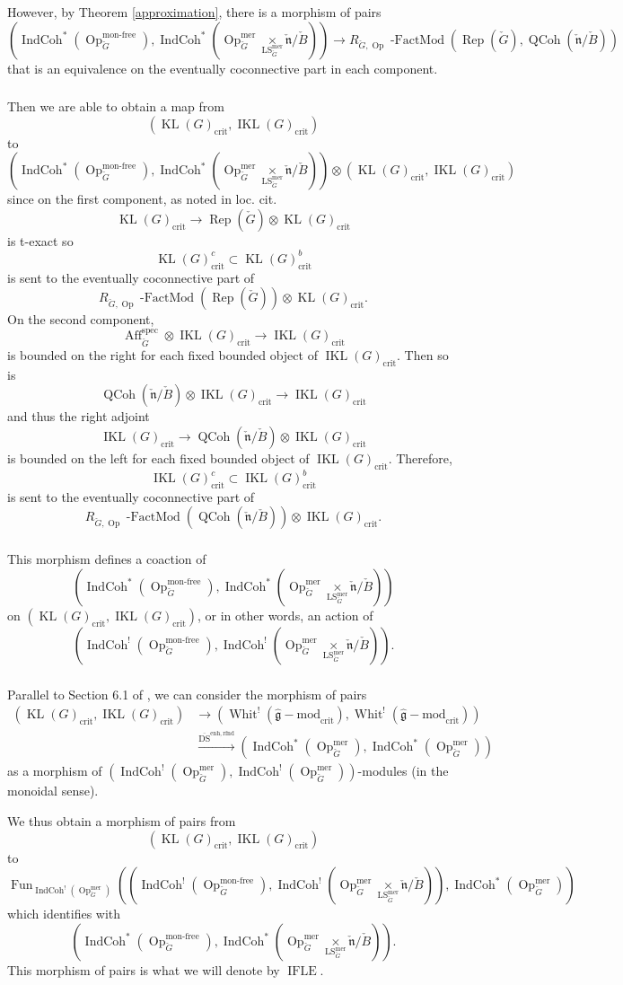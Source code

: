 \documentclass[10pt,a4paper]{amsart}
\newcommand{\on}[1]{\operatorname{#1}}
\newcommand{\QCoh}{\on{QCoh}}
\newcommand{\IndCoh}{\on{IndCoh}}
\newcommand{\gmod}{\on{\hat{\mathfrak{g}}-mod}}
\newcommand{\KL}{\on{KL}(G)_{\on{crit}}}
\newcommand{\IKL}{\on{IKL}(G)_{\on{crit}}}
\newcommand{\Gcheck}{\check{G}}
\newcommand{\ncheck}{\check{\mathfrak{n}}}
\newcommand{\Bcheck}{\check{B}}
\newcommand{\sssec}[1]{\subsubsection{}}
\begin{document}
However, by Theorem \ref{approximation}, there is a morphism of pairs
$$
(\IndCoh^*(\on{Op}_{\Gcheck}^{\on{mon-free}}), \IndCoh^*(\on{Op}_{\Gcheck}^{\on{mer}} \underset{\on{LS}_{\Gcheck}^{\on{mer}}}{\times} \ncheck/\Bcheck)) \to R_{\Gcheck, \on{Op}}\on{-FactMod}(\on{Rep}(\Gcheck), \QCoh(\ncheck/\Bcheck))
$$
that is an equivalence on the eventually coconnective part in each component.

\sssec{}
Then we are able to obtain a map from
$$
(\KL, \IKL)
$$
to
$$
(\IndCoh^*(\on{Op}_{\Gcheck}^{\on{mon-free}}), \IndCoh^*(\on{Op}_{\Gcheck}^{\on{mer}} \underset{\on{LS}_{\Gcheck}^{\on{mer}}}{\times} \ncheck/\Bcheck)) \otimes (\KL, \IKL)
$$
since on the first component, as noted in loc. cit.
$$
\KL \to \on{Rep}(\Gcheck) \otimes \KL
$$
is t-exact so
$$
\KL^c \subset \KL^b
$$
is sent to the eventually coconnective part of 
$$
R_{\Gcheck, \on{Op}}\on{-FactMod}(\on{Rep}(\Gcheck)) \otimes \KL.
$$
On the second component, 
$$
\on{Aff}_{\Gcheck}^{\on{spec}} \otimes \IKL \to \IKL
$$
is bounded on the right for each fixed bounded object of $\IKL$. Then so is
$$
\QCoh(\ncheck/\Bcheck) \otimes \IKL \to \IKL
$$
and thus the right adjoint
$$
\IKL \to \QCoh(\ncheck/\Bcheck) \otimes \IKL
$$
is bounded on the left for each fixed bounded object of $\IKL$. Therefore, 
$$
\IKL^c \subset \IKL^b
$$
is sent to the eventually coconnective part of 
$$
R_{\Gcheck, \on{Op}}\on{-FactMod}(\QCoh(\ncheck/\Bcheck)) \otimes \IKL.
$$

\sssec{}
This morphism defines a coaction of 
$$
(\IndCoh^*(\on{Op}_{\Gcheck}^{\on{mon-free}}), \IndCoh^*(\on{Op}_{\Gcheck}^{\on{mer}} \underset{\on{LS}_{\Gcheck}^{\on{mer}}}{\times} \ncheck/\Bcheck))
$$
on $(\KL, \IKL)$, or in other words, an action of 
$$
(\IndCoh^!(\on{Op}_{\Gcheck}^{\on{mon-free}}), \IndCoh^!(\on{Op}_{\Gcheck}^{\on{mer}} \underset{\on{LS}_{\Gcheck}^{\on{mer}}}{\times} \ncheck/\Bcheck)).
$$

\sssec{}
Parallel to Section 6.1 of \cite{GLC2}, we can consider the morphism of pairs
\begin{align}
(\KL, \IKL) &\to (\on{Whit}^!(\gmod_{\on{crit}}), \on{Whit}^!(\gmod_{\on{crit}}))  \\&\overset{\on{\overline{DS}^{enh, rfnd}}}{\to} (\IndCoh^*(\on{Op}_{\Gcheck}^{\on{mer}}), \IndCoh^*(\on{Op}_{\Gcheck}^{\on{mer}}))
\end{align}
as a morphism of $(\IndCoh^!(\on{Op}_{\Gcheck}^{\on{mer}}), \IndCoh^!(\on{Op}_{\Gcheck}^{\on{mer}}))$-modules (in the monoidal sense).

We thus obtain a morphism of pairs from
$$
(\KL, \IKL)
$$ 
to
$$
\on{Fun}_{\IndCoh^!(\on{Op}_{\Gcheck}^{\on{mer}})}((\IndCoh^!(\on{Op}_{\Gcheck}^{\on{mon-free}}), \IndCoh^!(\on{Op}_{\Gcheck}^{\on{mer}} \underset{\on{LS}_{\Gcheck}^{\on{mer}}}{\times} \ncheck/\Bcheck)), \IndCoh^*(\on{Op}_{\Gcheck}^{\on{mer}}))
$$
which identifies with
$$
(\IndCoh^*(\on{Op}_{\Gcheck}^{\on{mon-free}}), \IndCoh^*(\on{Op}_{\Gcheck}^{\on{mer}} \underset{\on{LS}_{\Gcheck}^{\on{mer}}}{\times} \ncheck/\Bcheck)).
$$
This morphism of pairs is what we will denote by $\on{IFLE}$.
\end{document}
